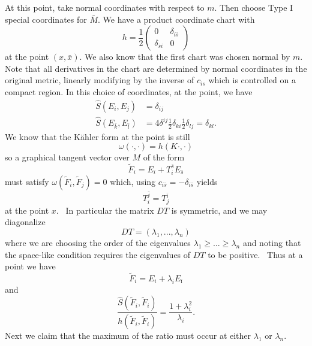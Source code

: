 \documentclass[12pt,letterpaper]{amsart}%
\numberwithin{mycounter}{section}
\theoremstyle{plain}
\numberwithin{equation}{section}
\theoremstyle{definition}
\begin{document}
At this point, take normal coordinates with respect to $m$.  Then choose Type I special coordinates for $\bar{M}$.
We have a product coordinate chart with%
\begin{equation*}
h=\frac{1}{2}\left( 
\begin{array}{cc}
0 & \delta _{i\bar{s}} \\ 
\delta _{\bar{s}i} & 0%
\end{array}%
\right) 
\end{equation*}%
at the point $\left( x,\bar{x}\right) $. We also know that the first chart
was chosen normal by $m.$ Note that all derivatives in the chart are
determined by normal coordinates in the original metric, linearly modifying
by the inverse of $c_{is}$ which is controlled on a compact region. 
In this choice of coordinates, at the point, we have 
\begin{align*}
\hat{S}\left( E_{i},E_{j}\right) & =\delta _{ij} \\
\hat{S}\left( E_{\bar{k}},E_{\bar{l}}\right) & =4\delta ^{ij}\frac{1}{2}\delta
_{ki}\frac{1}{2}\delta _{lj}=\delta _{kl}.
\end{align*}%
We  know that the K\"{a}hler form at the point is still 
\begin{equation*}
\omega (\cdot ,\cdot )=h(K\cdot ,\cdot )
\end{equation*}%
so a graphical tangent vector over $M$ of the form 
\begin{equation*}
\widetilde{F}_{i}=E_{i}+T_{i}^{\bar{s}}E_{\bar{s}}
\end{equation*}%
must satisfy $\omega (\widetilde{F}_{i},\widetilde{F}_{j})=0$ which, using $c_{i\bar{s}}=-\delta _{i%
\bar{s}}$ yields 
\begin{equation*}
T_{i}^{\bar{j}}=T_{j}^{\bar{\imath}}
\end{equation*}%
at the point $x.$ \ In particular the matrix $DT$ is symmetric, and we may
diagonalize 
\begin{equation*}
DT=\left( \lambda _{1},...,\lambda _{n}\right) 
\end{equation*}%
where we are choosing the order of the eigenvalues $\lambda _{1}\geq ...\geq
\lambda _{n}$ and noting that the space-like condition requires the
eigenvalues of $DT$ to be positive. \ Thus at a point we have 
\begin{equation*}
\widetilde{F}_{i}=E_{i}+\lambda _{i}E_{\bar{\imath}}
\end{equation*}%
and  
\begin{equation*}
\frac{\hat{S}(\widetilde{F}_{i},\widetilde{F}_{i})}{h(\widetilde{F}_{i},\widetilde{F}_{i})}
=\frac{1+\lambda _{i}^{2}}{\lambda _{i}}.
\end{equation*}%
Next we claim that the maximum of the ratio must occur at either $\lambda
_{1}$ or $\lambda _{n}.$
\end{document}
